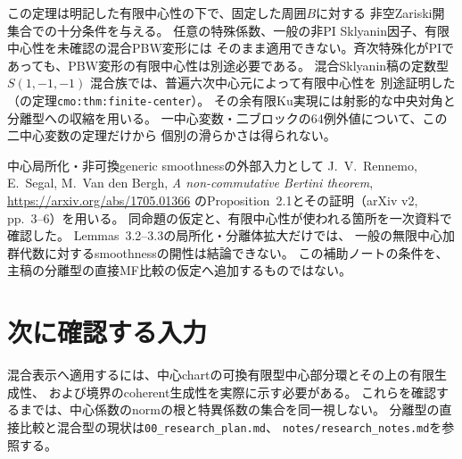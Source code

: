 \begin{remark}[適用限界と先行研究]
この定理は明記した有限中心性の下で、固定した周囲$B$に対する
非空Zariski開集合での十分条件を与える。
任意の特殊係数、一般の非PI Sklyanin因子、有限中心性を未確認の混合PBW変形には
そのまま適用できない。斉次特殊化がPIであっても、PBW変形の有限中心性は別途必要である。
混合Sklyanin稿の定数型 $S(1,-1,-1)$ 混合族では、普遍六次中心元によって有限中心性を
別途証明した（の定理\texttt{cmo:thm:finite-center}）。
その余有限Ku実現には射影的な中央対角と分離型への収縮を用いる。
一中心変数・二ブロックの64例外値について、この二中心変数の定理だけから
個別の滑らかさは得られない。

中心局所化・非可換generic smoothnessの外部入力として
J.~V.~Rennemo, E.~Segal, M.~Van den Bergh,
\emph{A non-commutative Bertini theorem},
\url{https://arxiv.org/abs/1705.01366}
のProposition~2.1とその証明（arXiv v2, pp.~3--6）を用いる。
同命題の仮定と、有限中心性が使われる箇所を一次資料で確認した。
Lemmas~3.2--3.3の局所化・分離体拡大だけでは、
一般の無限中心加群代数に対するsmoothnessの開性は結論できない。
この補助ノートの条件を、主稿の分離型の直接MF比較の仮定へ追加するものではない。
\end{remark}

\section{次に確認する入力}
混合表示へ適用するには、中心chartの可換有限型中心部分環とその上の有限生成性、
および境界のcoherent生成性を実際に示す必要がある。
これらを確認するまでは、中心係数のnormの根と特異係数の集合を同一視しない。
分離型の直接比較と混合型の現状は\texttt{00\_research\_plan.md}、
\texttt{notes/research\_notes.md}を参照する。

